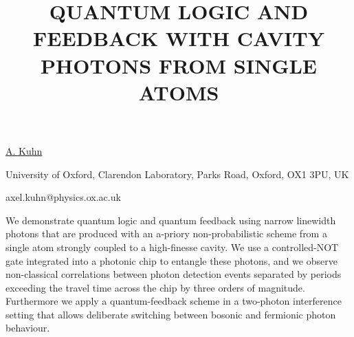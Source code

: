 \title{QUANTUM LOGIC AND FEEDBACK WITH CAVITY PHOTONS FROM SINGLE ATOMS}

\underline{A. Kuhn} 

{\normalsize{\vspace{-4mm}
University of Oxford,
Clarendon Laboratory,
Parks Road, Oxford,
OX1 3PU, UK

\email axel.kuhn@physics.ox.ac.uk}}

We demonstrate quantum logic and quantum feedback using narrow linewidth photons that are produced with an a-priory non-probabilistic
scheme from a single atom strongly coupled to a high-finesse cavity. We use a controlled-NOT gate integrated into a
photonic chip to entangle these photons, and we observe non-classical correlations between photon detection events separated by
periods exceeding the travel time across the chip by three orders of magnitude. Furthermore we apply a quantum-feedback scheme in a
two-photon interference setting that allows deliberate switching between bosonic and fermionic photon behaviour.


\vspace{\baselineskip} 